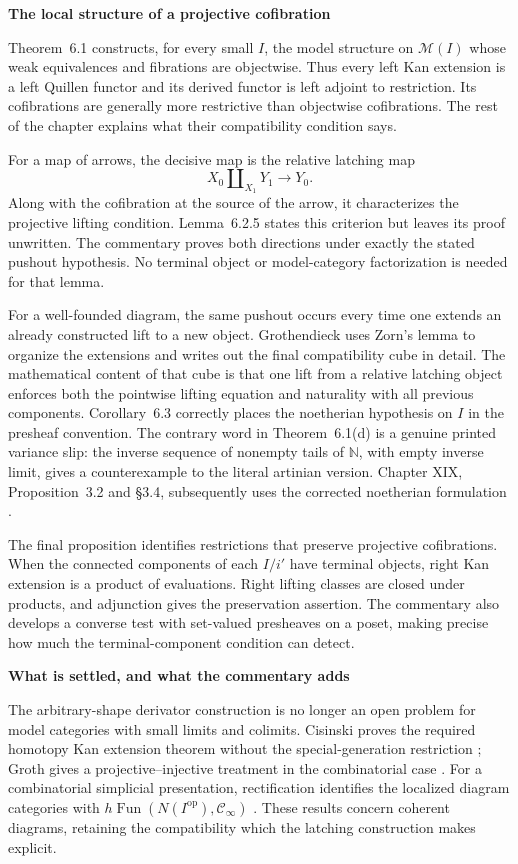 \medskip\noindent\textbf{The local structure of a projective cofibration}

Theorem~6.1 constructs, for every small $I$, the model structure on $\mathcal M(I)$ whose weak equivalences and fibrations are objectwise. Thus every left Kan extension is a left Quillen functor and its derived functor is left adjoint to restriction. Its cofibrations are generally more restrictive than objectwise cofibrations. The rest of the chapter explains what their compatibility condition says.

For a map of arrows, the decisive map is the relative latching map
\[
 X_0\amalg_{X_1}Y_1\longrightarrow Y_0.
\]
Along with the cofibration at the source of the arrow, it characterizes the projective lifting condition. Lemma~6.2.5 states this criterion but leaves its proof unwritten. The commentary proves both directions under exactly the stated pushout hypothesis. No terminal object or model-category factorization is needed for that lemma.

For a well-founded diagram, the same pushout occurs every time one extends an already constructed lift to a new object. Grothendieck uses Zorn's lemma to organize the extensions and writes out the final compatibility cube in detail. The mathematical content of that cube is that one lift from a relative latching object enforces both the pointwise lifting equation and naturality with all previous components. Corollary~6.3 correctly places the noetherian hypothesis on $I$ in the presheaf convention. The contrary word in Theorem~6.1(d) is a genuine printed variance slip: the inverse sequence of nonempty tails of $\mathbb N$, with empty inverse limit, gives a counterexample to the literal artinian version. Chapter XIX, Proposition~3.2 and \S3.4, subsequently uses the corrected noetherian formulation \citep{Grothendieck1990XIX}.

The final proposition identifies restrictions that preserve projective cofibrations. When the connected components of each $I/i'$ have terminal objects, right Kan extension is a product of evaluations. Right lifting classes are closed under products, and adjunction gives the preservation assertion. The commentary also develops a converse test with set-valued presheaves on a poset, making precise how much the terminal-component condition can detect.

\medskip\noindent\textbf{What is settled, and what the commentary adds}

The arbitrary-shape derivator construction is no longer an open problem for model categories with small limits and colimits. Cisinski proves the required homotopy Kan extension theorem without the special-generation restriction \citep[Theorem~6.11 and its dual]{Cisinski2003}; Groth gives a projective--injective treatment in the combinatorial case \citep[Proposition~1.30 and Theorem~1.32]{Groth2013}. For a combinatorial simplicial presentation, rectification identifies the localized diagram categories with $h\operatorname{Fun}(N(I^{\mathrm{op}}),\mathcal C_\infty)$ \citep[Proposition~4.2.4.4]{Lurie2009HTT}. These results concern coherent diagrams, retaining the compatibility which the latching construction makes explicit.

